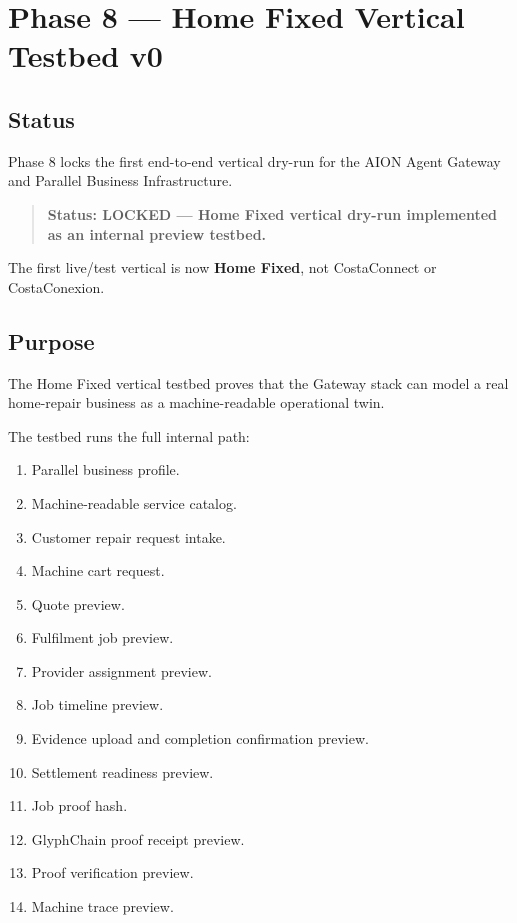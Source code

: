 \section{Phase 8 --- Home Fixed Vertical Testbed v0}
\label{sec:aion-home-fixed-vertical-testbed-v0}

\subsection{Status}

Phase 8 locks the first end-to-end vertical dry-run for the AION Agent Gateway and Parallel Business Infrastructure.

\begin{quote}
\textbf{Status: LOCKED --- Home Fixed vertical dry-run implemented as an internal preview testbed.}
\end{quote}

The first live/test vertical is now \textbf{Home Fixed}, not CostaConnect or CostaConexion.

\subsection{Purpose}

The Home Fixed vertical testbed proves that the Gateway stack can model a real home-repair business as a machine-readable operational twin.

The testbed runs the full internal path:

\begin{enumerate}
  \item Parallel business profile.
  \item Machine-readable service catalog.
  \item Customer repair request intake.
  \item Machine cart request.
  \item Quote preview.
  \item Fulfilment job preview.
  \item Provider assignment preview.
  \item Job timeline preview.
  \item Evidence upload and completion confirmation preview.
  \item Settlement readiness preview.
  \item Job proof hash.
  \item GlyphChain proof receipt preview.
  \item Proof verification preview.
  \item Machine trace preview.
\end{enumerate}


